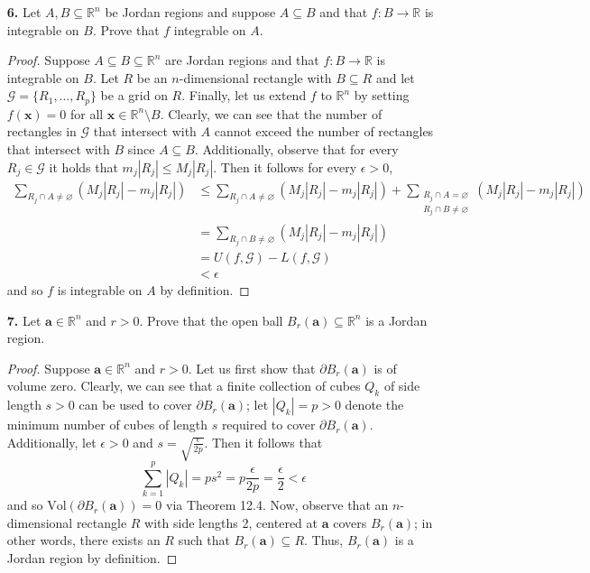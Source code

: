 \documentclass[ 12pt ]{article}
\begin{document}
\begin{enumerate}
	\item[\textbf{6.}] Let $A, B \subseteq \mathbb{R}^n$ be Jordan regions and suppose $A \subseteq B$ and that $f : B \to \mathbb{R}$ is integrable on $B$. Prove that $f$
		integrable on $A$.

		\begin{proof}
			Suppose $A \subseteq B \subseteq \mathbb{R}^n$ are Jordan regions and that $f : B \to \mathbb{R}$ is integrable on $B$. Let $R$ be an $n$-dimensional
			rectangle with $B \subseteq R$ and let $\mathcal{G} = \{ R_1, \hdots, R_p \}$ be a grid on $R$. Finally, let us extend $f$ to $\mathbb{R}^n$ by setting 
			$f(\textbf{x}) = 0$ for all $\textbf{x} \in \mathbb{R}^n \setminus B$. Clearly, we can see that the number of rectangles in $\mathcal{G}$ that intersect with
			$A$ cannot exceed the number of rectangles that intersect with $B$ since $A \subseteq B$. Additionally, observe that for every $R_j \in \mathcal{G}$ it holds
			that $m_j |R_j| \leq M_j |R_j|$. Then it follows for every $\epsilon > 0$,
			\begin{align*}
				\sum_{R_j \cap A \neq \varnothing} ( M_j|R_j| - m_j|R_j| ) &\leq \sum_{R_j \cap A \neq \varnothing} ( M_j|R_j| - m_j|R_j| ) + \sum_{\substack{R_j \cap A = \varnothing \\ R_j \cap B \neq \varnothing}} ( M_j|R_j| - m_j|R_j| ) \\
				&= \sum_{R_j \cap B \neq \varnothing} ( M_j|R_j| - m_j|R_j| ) \\
				&= U(f, \mathcal{G}) - L(f, \mathcal{G}) \\
				&< \epsilon
			\end{align*}
			and so $f$ is integrable on $A$ by definition.
		\end{proof}


	\item[\textbf{7.}] Let $\textbf{a} \in \mathbb{R}^n$ and $r > 0$. Prove that the open ball $B_r(\textbf{a}) \subseteq \mathbb{R}^n$ is a Jordan region.

		\begin{proof}
			Suppose $\textbf{a} \in \mathbb{R}^n$ and $r > 0$. Let us first show that $\partial B_r(\textbf{a})$ is of volume zero. Clearly, we can see that a finite
			collection of cubes $Q_k$ of side length $s > 0$ can be used to cover $\partial B_r(\textbf{a})$; let $|Q_k| = p > 0$ denote the minimum number of cubes of length
			$s$ required to cover $\partial B_r(\textbf{a})$. Additionally, let $\epsilon > 0$ and $s = \sqrt{\frac{\epsilon}{2p}}$. Then it follows that $$\sum_{k = 1}^p
			|Q_k| = ps^2 = p \frac{\epsilon}{2p} = \frac{\epsilon}{2} < \epsilon$$ and so $\mathrm{Vol}(\partial B_r(\textbf{a})) = 0$ via Theorem 12.4. Now, observe that
			an $n$-dimensional rectangle $R$ with side lengths 2, centered at $\textbf{a}$ covers $B_r(\textbf{a})$; in other words, there exists an $R$ such that $B_r
			(\textbf{a}) \subseteq R$. Thus, $B_r(\textbf{a})$ is a Jordan region by definition.
		\end{proof}
\end{enumerate}
\end{document}
